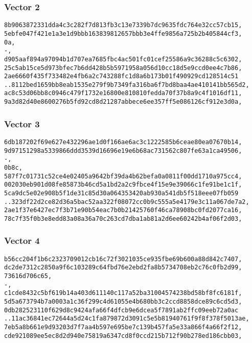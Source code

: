 \documentclass[
]{article}
\begin{document}
\hypertarget{vector-2}{%
\subsubsection{Vector 2}\label{vector-2}}

\begin{verbatim}
8b9063872331dda4c3c282f7d813fb3c13e7339b7dc9635fdc764e32cc57cb15,
5ebfe047f421e1a3e1d9bbb163839812657bbb3e4ffe9856a725b2b405844cf3,
0a,
-,
d905aaf894a97094b1d707ea7685fbc4ac501fc01cef25586a9c36288c5c6302,
25c5ab15ce5d973bfec7b6dd428b5b5971958a056d10cc18d5e9ccd0ee4c7b86,
2ae6660f435f733482e4fb6a2c743288fc1d8a6b173b01f490929cd128514c51
..8112bed1659bb8eab1535e279f9b7349fa316ba6f7bd8baa4ae410141bb565d2,
ac8c53d06bb8c0946c479f1732e16800e810810fedda70f37b8a9c4f1016df11,
9a3d82d40e8600276b5fd92cd8d21287abbece6ee357ff5e086126cf912e3d0a,
\end{verbatim}

\hypertarget{vector-3}{%
\subsubsection{Vector 3}\label{vector-3}}

\begin{verbatim}
6db187202f69e627e432296ae1d0f166ae6ac3c1222585b6ceae80ea07670b14,
9d97151298a5339866ddd3539d16696e19e6b68ac731562c807fe63a1ca49506,
-,
0b8c,
587f7c01731c52ce4e02405a9642bf39da4b62befa0a0811f00dd1710a975cc4,
002030eb901d08fe85873b46cd5a1bd2a2c9fbce4f15e9e39066c1fe91be1c1f,
5ca9dc5e02e908b5f1de31c85d30a064353420ab930a541db5f518eee07fb059
..323df22d2ce82d36a5bac52aa322f08072cc0b9c555a5e4179e3c11a067de7a2,
2ae1f37e6427ec7f3b71e90b54eac7b0b21425760f46ca78908bc0fd2077ca16,
78c7f35f0b3e8edd83a08a36a70c263cd7dba1ab81a2d6ee60242b4af06f2d03,
\end{verbatim}

\hypertarget{vector-4}{%
\subsubsection{Vector 4}\label{vector-4}}

\begin{verbatim}
b56cc204f1b6c2323709012cb16c72f3021035ce935fbe69b600a88d842c7407,
dc2de7312c2850a9f6c103289c64fbd76e2ebd2fa8b5734708eb2c76c0fb2d99,
73616d706c65,
-,
c1cde8432c5bf619b14a403d611140c117a52ba31004574238bd58bf8fc6181f,
5d5a673794b7a0003a1c36f299c4d61055e4b680bb3c2ccd8858dce89c6cd5d3,
0db282523110f629d8c9424afa66f4dfcb9e6dcea5f7891ab2ffc09eeb72a0ac
..11ac36841ec72644a5d24c1fa879872d3091c5e5b81940761f9f8f378f5013ae,
7eb5a8b661e9d93203d7f7aa4b597e695be7c139b457fa5e33a866f4a66f2f12,
cde921089ee5ec8d2d940e75819a6347cd8f0ccd215b712f90b278ed186cbb03,
\end{verbatim}
\end{document}
